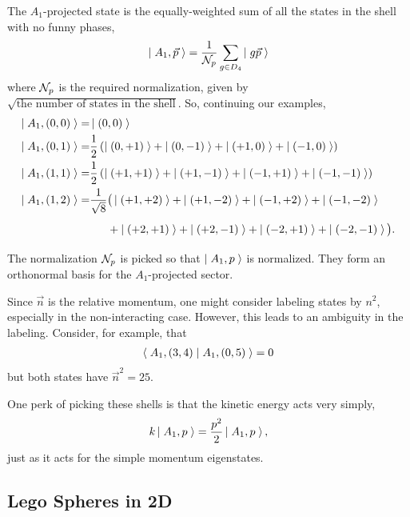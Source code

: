 The $A_1$-projected state is the equally-weighted sum of all the states in the shell with no funny phases,
\begin{align}
    \left|\;A_1, \vec{p}\;\right\rangle = \frac{1}{\mathcal{N}_{p}} \sum_{g\in D_4} \left|\;g\vec{p}\;\right\rangle
\end{align}
where $\mathcal{N}_{p}$ is the required normalization, given by $\sqrt{\textrm{the number of states in the shell}}$.
So, continuing our examples,
\begin{align}
    \ket{A_1, (0,0)} =& \ket{(0,0)}
    \\
    \ket{A_1, (0,1)} =& \frac{1}{2}\left(\ket{(0,+1)} + \ket{(0,-1)} + \ket{(+1,0)} + \ket{(-1,0)} \right)
    \\
    \ket{A_1, (1,1)} =& \frac{1}{2}\left(\ket{(+1,+1)} + \ket{(+1,-1)} + \ket{(-1,+1)} + \ket{(-1,-1)} \right)
    \\
    \ket{A_1, (1,2)} =& \frac{1}{\sqrt{8}}\big(\ket{(+1,+2)} + \ket{(+1,-2)} + \ket{(-1,+2)} + \ket{(-1,-2)} \nonumber\\
                     &\phantom{\frac{1}{\sqrt{8}}}+ \ket{(+2,+1)} + \ket{(+2,-1)} + \ket{(-2,+1)} + \ket{(-2,-1)} \big).
\end{align}
The normalization $\mathcal{N}_{p}$ is picked so that $\left|\;A_1, p\;\right\rangle$ is normalized.
They form an orthonormal basis for the $A_1$-projected sector.

Since $\vec{n}$ is the relative momentum, one might consider labeling states by $n^2$, especially in the non-interacting case.
However, this leads to an ambiguity in the labeling.
Consider, for example, that
\begin{align}
    \left\langle\;A_1, (3,4)\;\middle|\;A_1, (0,5)\;\right\rangle = 0
\end{align}
but both states have $\vec{n}^2=25$.

One perk of picking these shells is that the kinetic energy acts very simply,
\begin{align}
    k \left|\;A_1, p\;\right\rangle = \frac{p^2}{2} \left|\;A_1, p\;\right\rangle,
\end{align}
just as it acts for the simple momentum eigenstates.

\subsection{Lego Spheres in 2D}

